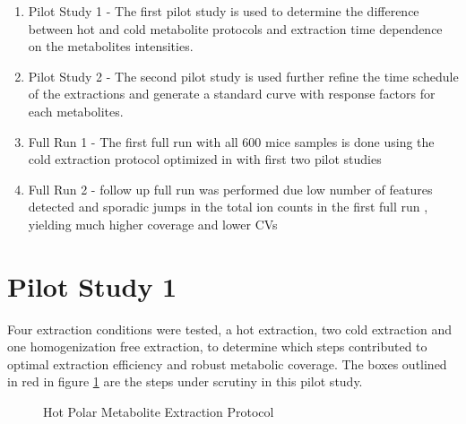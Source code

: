 \documentclass[a4paper,11pt,twoside]{book}
\begin{document}
	\begin{enumerate}
		\item Pilot Study 1 - The first pilot study is used to determine the difference between hot and cold metabolite protocols and extraction time dependence on the metabolites intensities.
		\item Pilot Study 2 - The second pilot study is used further refine the time schedule of the extractions and generate a standard curve with response factors for each metabolites. 
		\item Full Run 1 - The first full run with all 600 mice samples is done using the cold extraction protocol optimized in with first two pilot studies 
		\item Full Run 2 - follow up full run was performed due low number of features detected and sporadic jumps in the total ion counts in the first full run , yielding much higher coverage and lower CVs 
	\end{enumerate}
	
	\section{Pilot Study 1}
	
	Four extraction conditions were tested, a hot extraction, two cold extraction and one homogenization free extraction, to determine which steps contributed to optimal extraction efficiency and robust metabolic coverage. The boxes outlined in red in figure \ref{fig:Hot Extraction Protocol} are the steps under scrutiny in this pilot study.
		
	\begin{figure}[b!ht]
		\centering
		\caption{Hot Polar Metabolite Extraction Protocol}
		\label{fig:Hot Extraction Protocol}
	\end{figure}
	
\end{document}
